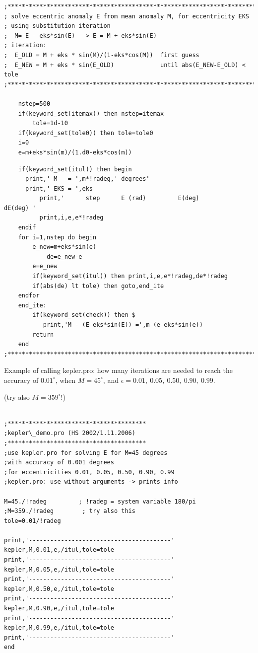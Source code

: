 \documentclass[a4paper,12pt]{article}
\def\red{\color{red}}
\def\black{\color{RGBblack}}
\begin{document}
{{{\begin{verbatim}
;****************************************************************************
; solve eccentric anomaly E from mean anomaly M, for eccentricity EKS
; using substitution iteration
;  M= E - eks*sin(E)  -> E = M + eks*sin(E)
; iteration: 
;  E_OLD = M + eks * sin(M)/(1-eks*cos(M))  first guess
;  E_NEW = M + eks * sin(E_OLD)             until abs(E_NEW-E_OLD) < tole
;****************************************************************************

	nstep=500
	if(keyword_set(itemax)) then nstep=itemax
        tole=1d-10
	if(keyword_set(tole0)) then tole=tole0
	i=0
	e=m+eks*sin(m)/(1.d0-eks*cos(m))

\end{verbatim}
\black}

{\red \scriptsize
\begin{verbatim}
	if(keyword_set(itul)) then begin
	  print,' M   = ',m*!radeg,' degrees'
	  print,' EKS = ',eks
          print,'      step      E (rad)         E(deg)         dE(deg) '
          print,i,e,e*!radeg
	endif
	for i=1,nstep do begin
	    e_new=m+eks*sin(e)
            de=e_new-e
	    e=e_new
	    if(keyword_set(itul)) then print,i,e,e*!radeg,de*!radeg
	    if(abs(de) lt tole) then goto,end_ite
	endfor
	end_ite: 
        if(keyword_set(check)) then $
           print,'M - (E-eks*sin(E)) =',m-(e-eks*sin(e))
        return
	end
;***********************************************************************
\end{verbatim}
\black}



\bul Example of calling kepler.pro: how many iterations
are needed to reach the accuracy of $0.01^\circ$, when $M= 45^\circ$,
and $\epsilon =0.01, \ 0.05, \ 0.50, \ 0.90, \ 0.99$.

\buu (try also $M=359^\circ$!)

{\red \scriptsize \begin{verbatim}

;***************************************
;kepler\_demo.pro (HS 2002/1.11.2006)
;***************************************
;use kepler.pro for solving E for M=45 degrees
;with accuracy of 0.001 degrees
;for eccentricities 0.01, 0.05, 0.50, 0.90, 0.99
;kepler.pro: use without arguments -> prints info

M=45./!radeg         ; !radeg = system variable 180/pi
;M=359./!radeg        ; try also this
tole=0.01/!radeg

print,'----------------------------------------'
kepler,M,0.01,e,/itul,tole=tole
print,'----------------------------------------'
kepler,M,0.05,e,/itul,tole=tole
print,'----------------------------------------'
kepler,M,0.50,e,/itul,tole=tole
print,'----------------------------------------'
kepler,M,0.90,e,/itul,tole=tole                   
print,'----------------------------------------'
kepler,M,0.99,e,/itul,tole=tole                   
print,'----------------------------------------'
end


\end{verbatim}}}}
\end{document}
